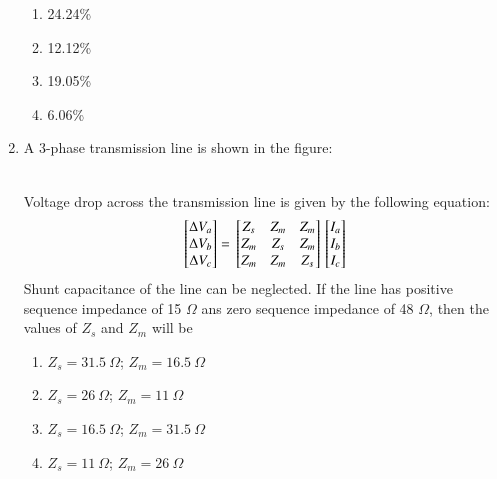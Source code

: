 \documentclass[journal]{IEEEtran}
\begin{document}
\begin{enumerate}
\begin{enumerate}
    \item 24.24\%
    \item 12.12\%
    \item 19.05\%
    \item 6.06\% \\
\end{enumerate}
\item A 3-phase transmission line is shown in the figure:\\
\begin{figure}[!ht]
\centering
\resizebox{0.3\textwidth}{!}{%

}%
\end{figure}
\begin{figure}[!ht]
\centering
\resizebox{0.3\textwidth}{!}{%

}%
\end{figure}
\begin{figure}[!ht]
\centering
\resizebox{0.3\textwidth}{!}{%

}%
\end{figure}\\
Voltage drop across the transmission line is given by the following equation:
\begin{align*}
    {}\left[\begin{matrix}
        \Delta V_a \\ \Delta V_b \\ \Delta V_c
    \end{matrix}\right] = {}\left[\begin{matrix}
        Z_s & Z_m & Z_m \\Z_m & Z_s & Z_m \\ Z_m & Z_m & Z_s
    \end{matrix}\right]{}\left[\begin{matrix}
        I_a \\ I_b \\ I_c
    \end{matrix}\right]
\end{align*}
Shunt capacitance of the line can be neglected. If the line has positive sequence impedance of 15 $\Omega$ ans zero sequence impedance of 48 $\Omega$, then the values of $Z_s$ and $Z_m$ will be
\begin{enumerate}
    \item $Z_s=31.5\ \Omega$; $Z_m=16.5\ \Omega$
    \item $Z_s=26\ \Omega$; $Z_m=11\ \Omega$
    \item $Z_s=16.5\ \Omega$; $Z_m=31.5\ \Omega$
    \item $Z_s=11\ \Omega$; $Z_m=26\ \Omega$ \\

\end{enumerate}
\end{enumerate}
\end{document}
